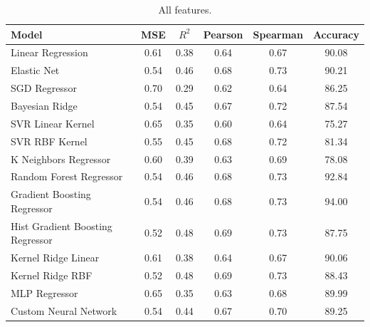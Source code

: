 \begin{table}[ht]
    \begin{subtable}[t]{\textwidth}
        \centering
        \begin{tabular}{|l|c|c|c|c|c|}
            \hline
            Model & MSE & $R^2$ & Pearson & Spearman & Accuracy \\
            \hline
            Linear Regression                & 0.61 & 0.38 & 0.64 & 0.67 & 90.08 \\
            Elastic Net                      & 0.54 & 0.46 & 0.68 & 0.73 & 90.21 \\
            SGD Regressor                    & 0.70 & 0.29 & 0.62 & 0.64 & 86.25 \\
            Bayesian Ridge                   & 0.54 & 0.45 & 0.67 & 0.72 & 87.54 \\
            SVR Linear Kernel                & 0.65 & 0.35 & 0.60 & 0.64 & 75.27 \\
            SVR RBF Kernel                   & 0.55 & 0.45 & 0.68 & 0.72 & 81.34 \\
            K Neighbors Regressor            & 0.60 & 0.39 & 0.63 & 0.69 & 78.08 \\
            Random Forest Regressor          & 0.54 & 0.46 & 0.68 & 0.73 & 92.84 \\
            Gradient Boosting Regressor      & 0.54 & 0.46 & 0.68 & 0.73 & 94.00 \\
            Hist Gradient Boosting Regressor & 0.52 & 0.48 & 0.69 & 0.73 & 87.75 \\
            Kernel Ridge Linear              & 0.61 & 0.38 & 0.64 & 0.67 & 90.06 \\
            Kernel Ridge RBF                 & 0.52 & 0.48 & 0.69 & 0.73 & 88.43 \\
            MLP Regressor                    & 0.65 & 0.35 & 0.63 & 0.68 & 89.99 \\
            Custom Neural Network            & 0.54 & 0.44 & 0.67 & 0.70 & 89.25 \\
            \hline
        \end{tabular}
        \caption{All features.}
        \label{tab:simple_models_results_all}
    \end{subtable}     
\end{table}


